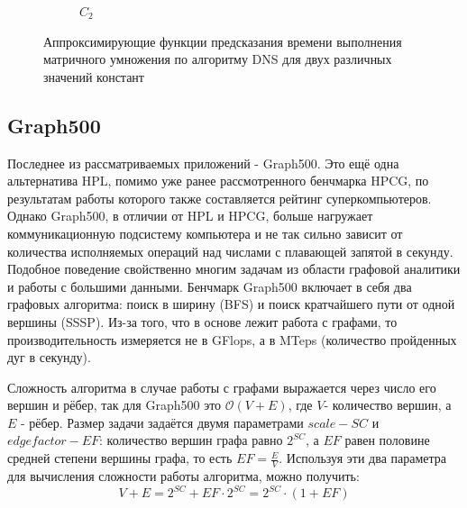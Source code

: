 \begin{figure}
\begin{subfigure}{.5\textwidth}
				\caption{\(C_2\)}
				\label{graph_C_2_DNS}
			\end{subfigure}
			\caption{Аппроксимирующие функции предсказания времени выполнения матричного умножения по алгоритму DNS для двух различных значений констант}
			\label{graph_DNS}
			\end{figure}

	\subsection{Graph500}
		Последнее из рассматриваемых приложений - Graph500. Это ещё одна альтернатива HPL, помимо уже ранее рассмотренного бенчмарка HPCG, по результатам работы которого также составляется рейтинг суперкомпьютеров. Однако Graph500, в отличии от HPL и HPCG, больше нагружает коммуникационную подсистему компьютера и не так сильно зависит от количества исполняемых операций над числами с плавающей запятой в секунду. Подобное поведение свойственно многим задачам из области графовой аналитики и работы с большими данными. Бенчмарк Graph500 включает в себя два графовых алгоритма: поиск в ширину (BFS) и поиск кратчайшего пути от одной вершины (SSSP). Из-за того, что в основе лежит работа с графами, то производительность измеряется не в GFlops, а в MTeps (количество пройденных дуг в секунду).

		Сложность алгоритма в случае работы с графами выражается через число его вершин и рёбер, так для Graph500 это \(\mathcal{O}(V + E)\), где \(V\)- количество вершин, а \(E\) - рёбер. Размер задачи задаётся двумя параметрами \(scale - SC\) и \(edgefactor - EF\): количество вершин графа равно \(2^{SC}\), а \(EF\) равен половине средней степени вершины графа, то есть \(EF = \frac{E}{V}\). Используя эти два параметра для вычисления сложности работы алгоритма, можно получить: \[V + E = 2^{SC} + EF \cdot 2^{SC} = 2^{SC} \cdot (1 + EF) \]

